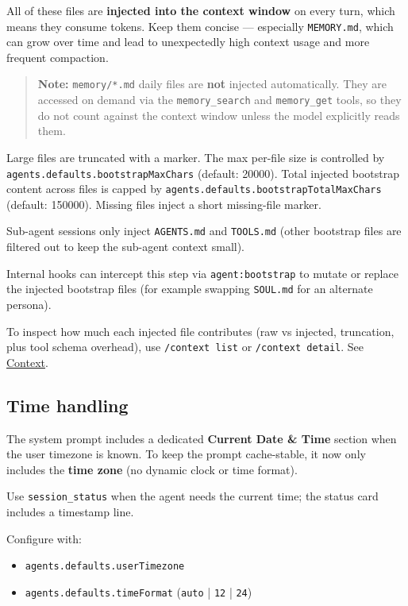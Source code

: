 All of these files are \textbf{injected into the context window} on every turn, which
means they consume tokens. Keep them concise — especially \texttt{MEMORY.md}, which can
grow over time and lead to unexpectedly high context usage and more frequent
compaction.

\begin{quote}
\textbf{Note:} \texttt{memory/*.md} daily files are \textbf{not} injected automatically. They
are accessed on demand via the \texttt{memory\_search} and \texttt{memory\_get} tools, so they
do not count against the context window unless the model explicitly reads them.
\end{quote}


Large files are truncated with a marker. The max per-file size is controlled by
\texttt{agents.defaults.bootstrapMaxChars} (default: 20000). Total injected bootstrap
content across files is capped by \texttt{agents.defaults.bootstrapTotalMaxChars}
(default: 150000). Missing files inject a short missing-file marker.

Sub-agent sessions only inject \texttt{AGENTS.md} and \texttt{TOOLS.md} (other bootstrap files
are filtered out to keep the sub-agent context small).

Internal hooks can intercept this step via \texttt{agent:bootstrap} to mutate or replace
the injected bootstrap files (for example swapping \texttt{SOUL.md} for an alternate persona).

To inspect how much each injected file contributes (raw vs injected, truncation, plus tool schema overhead), use \texttt{/context list} or \texttt{/context detail}. See \href{/concepts/context}{Context}.

\subsection{Time handling}


The system prompt includes a dedicated \textbf{Current Date \& Time} section when the
user timezone is known. To keep the prompt cache-stable, it now only includes
the \textbf{time zone} (no dynamic clock or time format).

Use \texttt{session\_status} when the agent needs the current time; the status card
includes a timestamp line.

Configure with:

\begin{itemize}
  \item \texttt{agents.defaults.userTimezone}
  \item \texttt{agents.defaults.timeFormat} (\texttt{auto} | \texttt{12} | \texttt{24})
\end{itemize}


